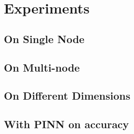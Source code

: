 
\section{Experiments}
\subsection{On Single Node}
\begin{frame}
  \frametitle{}

  

\end{frame}

\subsection{On Multi-node}
\begin{frame}
  \frametitle{}

  

\end{frame}

\subsection{On Different Dimensions}
\begin{frame}
  \frametitle{}

  

\end{frame}

\subsection{With PINN on accuracy}
\begin{frame}
  \frametitle{}

  

\end{frame}